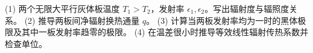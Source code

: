 (1) 两个无限大平行灰体板温度 \(T_1>T_2\)，发射率 \(\epsilon_1,\epsilon_2\)。写出辐射度与辐照度关系。
(2) 推导两板间净辐射换热通量 \(q\)。
(3) 计算当两板发射率均为一时的黑体极限及其中一板发射率趋零的极限。
(4) 在温差很小时推导等效线性辐射传热系数并检查单位。
